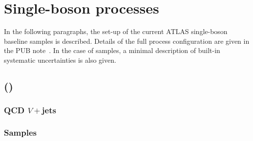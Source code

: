 \section{Single-boson processes}

In the following paragraphs, the set-up of the current ATLAS single-boson baseline samples is described. 
Details of the full process configuration are given in the PUB note~\cite{ATL-PHYS-PUB-2017-006}. In the case of \SHERPA samples,
a minimal description of built-in systematic uncertainties is also given.  


\subsection[Sherpa MEPS@NLO]{\SHERPA (\MEPSatNLO)}

\subsubsection{QCD $V+$jets}

\subsubsection*{Samples}

